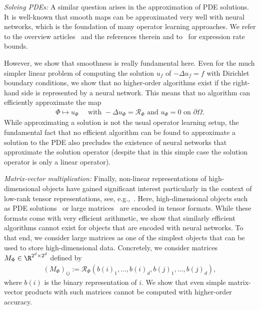 \documentclass{amsart}[11pt]
\numberwithin{equation}{section}
\newcommand{\realization}{\mathcal{R}}
\numberwithin{theorem}{section}
\begin{document}
\emph{Solving PDEs: }A similar question arises in the approximation of PDE solutions. It is well-known that smooth maps can be approximated very well with neural networks, which is the foundation of many operator learning approaches.
We refer to the overview articles~\cite{kovachki2024operatorlearningalgorithmsanalysis, azizzadenesheli2024neuraloperatorsacceleratingscientific} 
and the references therein and to~\cite{neuralops,MarcatiChS24,schwab2023deepoperatornetworkapproximation,Lan2022DeepONets} for expression rate bounds.

However, we show that smoothness is really fundamental here. Even for the much simpler linear problem of computing the solution $u_f$ of $-\Delta u_f=f$ with Dirichlet boundary conditions, we show that no higher-order algorithms exist if the right-hand side is represented by a neural network.
This means that no algorithm can efficiently approximate the map
\begin{align*}
\Phi \mapsto u_\Phi\quad\text{ with } -\Delta u_\Phi = \realization_\Phi \text{ and } u_\Phi =0 \text{ on }\partial\Omega.
\end{align*}
While approximating a solution is not the usual operator learning setup, the fundamental fact that no efficient algorithm can be found to approximate a solution to the PDE also precludes the existence of neural networks that approximate the solution operator (despite that in this simple case the solution operator is only a linear operator).


\emph{Matrix-vector multiplication:} Finally, non-linear representations of high-dimensional objects have gained significant interest particularly in the context of low-rank tensor representations, see, e.g.,~\cite{tt1,tt2}. Here, high-dimensional objects such as PDE solutions~\cite{qtt} or large matrices~\cite{ttmatrix} are encoded in tensor formats. 
While these formats come with very efficient arithmetic, we show that similarly efficient algorithms cannot exist for objects that are encoded with neural networks.  To that end, we consider large matrices as one of the simplest objects  that can be used to store high-dimensional data.
Concretely, we consider matrices $M_\Phi\in \R^{2^d\times 2^d}$ defined by
\begin{align*}
(M_{\Phi})_{ij} := \realization_\Phi(b(i)_1,\ldots,b(i)_d,b(j)_1,\ldots,b(j)_d),
\end{align*}
where $b(i)$ is the binary representation of $i$. We show that even simple matrix-vector products with such matrices cannot be computed with higher-order accuracy.
\end{document}
